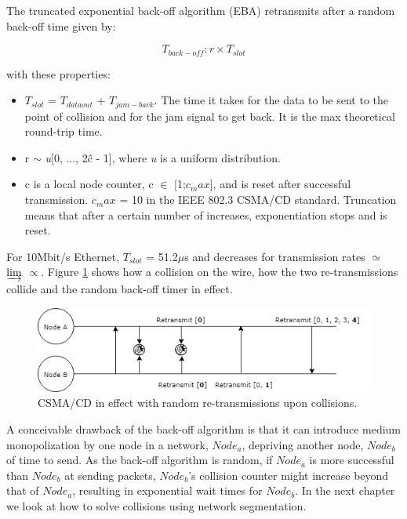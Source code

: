 The truncated exponential back-off algorithm (EBA) retransmits after a random back-off time given by:

\[ T_{back-off}: r \times T_{slot} \]

with these properties:

\begin{itemize}
	\item $T_{slot}$ = $T_{dataout}$ + $T_{jam-back}$. The time it takes for the data to be sent to the point of collision and for the jam signal to get back. It is the max theoretical round-trip time.
	\item r $\sim$ \textit{u}[0, ..., 2\^{c} - 1], where \textit{u} is a uniform distribution.
	\item c is a local node counter, c $\in$ [1;$c_max$], and is reset after successful transmission. $c_max$ = 10 in the IEEE 802.3 CSMA/CD standard. Truncation means that after a certain number of increases, exponentiation stops and is reset.
\end{itemize}

For 10Mbit/s Ethernet, $T_{slot}$ = 51.2$\mu$s and decreases for transmission rates $\simeq$ $\varinjlim$ $\propto$. Figure \ref{fig:csmacd} shows how a collision on the wire, how the two re-transmissions collide and the random back-off timer in effect.

\begin{figure}[h!]\label{}
	\centering
	\includegraphics[scale=0.5]{realTimeEthernet/CSMACD.png}
	\caption{CSMA/CD in effect with random re-transmissions upon collisions.}
	\label{fig:csmacd}
\end{figure}

A conceivable drawback of the back-off algorithm is that it can introduce medium monopolization by one node in a network, $Node_{a}$, depriving another node, $Node_{b}$ of time to send. As the back-off algorithm is random, if $Node_{a}$ is more successful than $Node_{b}$ at sending packets, $Node_{b}$'s collision counter might increase beyond that of $Node_{a}$, resulting in exponential wait times for $Node_{b}$. In the next chapter we look at how to solve collisions using network segmentation.

